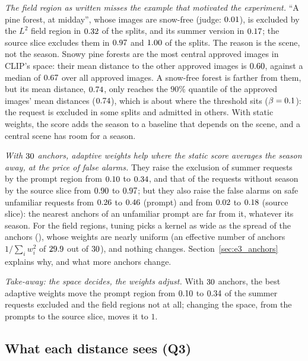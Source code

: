 \documentclass{article}
\theoremstyle{plain}
\theoremstyle{remark}
\begin{document}
\emph{The field region as written misses the example that motivated the experiment.} ``A pine forest, at midday'', whose images are
snow-free (judge: $0.01$), is excluded by the $L^2$ field region in $0.32$ of the splits, and its summer version
in $0.17$; the source slice excludes them in $0.97$ and $1.00$ of the splits. The reason is the scene,
not the season. Snowy pine forests are the most central approved images in CLIP's space: their mean distance to the other approved
images is $0.60$, against a median of $0.67$ over all approved images. A snow-free forest is farther from them,
but its mean distance, $0.74$, only reaches the $90\%$ quantile of the approved images' mean distances ($0.74$),
which is about where the threshold sits ($\beta=0.1$): the request is excluded in some splits and admitted in others. With
static weights, the score adds the season to a baseline that depends on the scene, and a central scene has room for a season.

\emph{With $30$ anchors, adaptive weights help where the static score averages the season away, at the price of false alarms.}
They raise the exclusion of summer requests by the prompt region from $0.10$ to $0.34$, and that of the requests
without season by the source slice from $0.90$ to $0.97$; but they also raise the false alarms on safe unfamiliar
requests from $0.26$ to $0.46$ (prompt) and from $0.02$ to $0.18$ (source slice): the nearest anchors of an
unfamiliar prompt are far from it, whatever its season. For the field regions, tuning picks a kernel as wide as the spread of the
anchors (\ethVarTRA), whose weights are nearly uniform (an effective number of anchors $1/\sum_iw_i^2$ of $29.9$ out of
$30$), and nothing changes. Section~\ref{sec:e3_anchors} explains why, and what more anchors change.

\emph{Take-away: the space decides, the weights adjust.} With $30$ anchors, the best adaptive weights move the prompt region from
$0.10$ to $0.34$ of the summer requests excluded and the field regions not at all; changing the space, from the prompts
to the source slice, moves it to $1$.

\subsection{What each distance sees (Q3)}\label{sec:e3_spaces}
\end{document}
